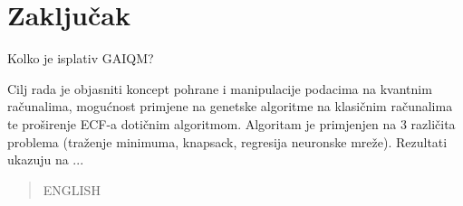 \documentclass[times, utf8, zavrsni]{fer}
\begin{document}
\newpage

\chapter{Zaključak}
Kolko je isplativ GAIQM?




\begin{sazetak}
Cilj rada je objasniti koncept pohrane i manipulacije podacima na kvantnim računalima, mogućnost primjene na genetske algoritme na klasičnim računalima te proširenje ECF-a dotičnim algoritmom. Algoritam je primjenjen na 3 različita problema (traženje minimuma, knapsack, regresija neuronske mreže). Rezultati ukazuju na ...

\end{sazetak}

\begin{abstract}
ENGLISH

\end{abstract}
\end{document}

